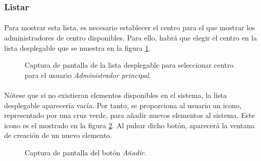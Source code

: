 \subsubsection{Listar}

  \paragraph{}Para mostrar esta lista, es necesario establecer el centro para
  el que mostrar los administradores de centro disponibles. Para ello, habrá
  que elegir el centro en la lista desplegable que se muestra en la figura
  \ref{capturaPantallaSelectCentro}.

  \begin{figure}[!ht]
    \begin{center}
      \caption{Captura de pantalla de la lista desplegable para seleccionar centro para el usuario \textit{Administrador principal}.}
      \label{capturaPantallaSelectCentro}
    \end{center}
  \end{figure}

  \paragraph{}Nótese que si no existieran elementos disponibles en el sistema,
  la lista desplegable aparecería vacía. Por tanto, se proporciona al usuario
  un icono, representado por una cruz verde, para añadir nuevos elementos al
  sistema. Este icono es el mostrado en la figura \ref{capturaBotonAdd}. Al
  pulsar dicho botón, aparecerá la ventana de creación de un nuevo elemento.

  \begin{figure}[!ht]
    \begin{center}
      \caption{Captura de pantalla del botón \textit{Añadir}.}
      \label{capturaBotonAdd}
    \end{center}
  \end{figure}

